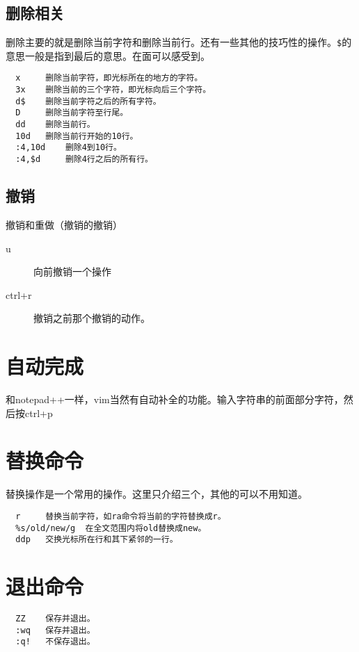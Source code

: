 \documentclass[a4paper,12pt]{ctexart}%
\begin{document}
\subsection{删除相关}
删除主要的就是删除当前字符和删除当前行。还有一些其他的技巧性的操作。\verb|$|的意思一般是指到最后的意思。在面可以感受到。
\begin{verbatim}
  x     删除当前字符，即光标所在的地方的字符。
  3x    删除当前的三个字符，即光标向后三个字符。
  d$    删除当前字符之后的所有字符。
  D     删除当前字符至行尾。
  dd    删除当前行。
  10d   删除当前行开始的10行。
  :4,10d    删除4到10行。
  :4,$d     删除4行之后的所有行。
\end{verbatim}

\subsection{撤销}
撤销和重做（撤销的撤销）
\begin{description}
  \item[u] 向前撤销一个操作
  \item[ctrl+r] 撤销之前那个撤销的动作。
\end{description}

\section{自动完成}
和notepad++一样，vim当然有自动补全的功能。输入字符串的前面部分字符，然后按ctrl+p

\section{替换命令}
替换操作是一个常用的操作。这里只介绍三个，其他的可以不用知道。
\begin{verbatim}
  r     替换当前字符，如ra命令将当前的字符替换成r。
  %s/old/new/g  在全文范围内将old替换成new。
  ddp   交换光标所在行和其下紧邻的一行。
\end{verbatim}









\section{退出命令}
\begin{verbatim}
  ZZ    保存并退出。
  :wq   保存并退出。
  :q!   不保存退出。
\end{verbatim}
\end{document}
